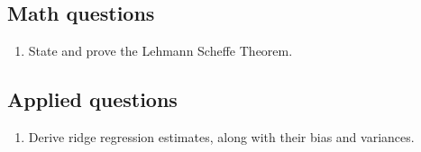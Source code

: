 \documentclass[10pt, twocolumn]{article}
\begin{document}
\subsection{Math questions}

\begin{enumerate}
    \item State and prove the Lehmann Scheffe Theorem.
\end{enumerate}

\subsection{Applied questions}

\begin{enumerate}
    \item Derive ridge regression estimates, along with their bias and
        variances.
\end{enumerate}
\end{document}
